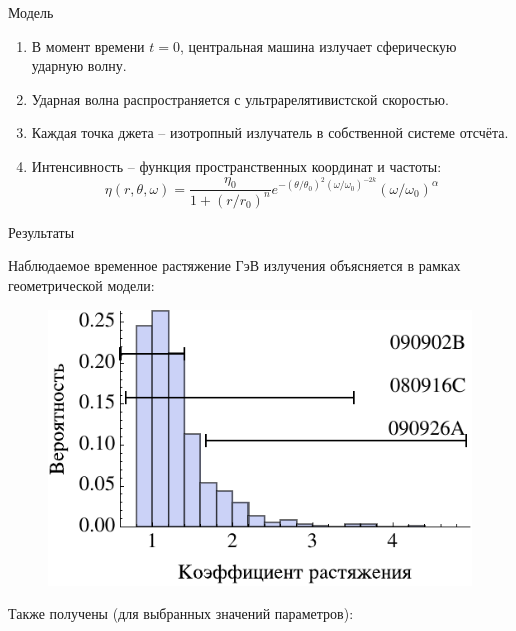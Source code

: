 \documentclass[russian]{beamer}
\begin{document}
\begin{frame}
\begin{columns}[t]
\begin{column}[t]{0.4\linewidth}
\begin{block}{Модель}
					\begin{enumerate}
						\item{В момент времени $t = 0$, центральная машина излучает сферическую ударную волну.}
						\item{Ударная волна распространяется с ультрарелятивистской скоростью.}
						\item{Каждая точка джета -- изотропный излучатель в собственной системе отсчёта.}
						\item{
							Интенсивность -- функция пространственных координат и частоты:
							\begin{equation*}
								\eta\left(r,\theta,\omega\right) = 
								\frac{\eta_0}{1 + \left(r/r_0\right)^n}
								e^{
									-\left(\theta/\theta_0\right)^2
									\left(\omega/\omega_0\right)^{-2k}
								}
								\left(\omega/\omega_0\right)^\alpha
							\end{equation*}
						}
					\end{enumerate}

			   	\end{block}
				
			   	\begin{block}{Результаты}

			   		Наблюдаемое временное растяжение ГэВ излучения объясняется в рамках геометрической модели:

			   		\begin{figure}
			   			\centering
			   			\includegraphics[width=\textwidth]{kappaDistributionHistogram}
			   			\label{fig:kappaDistributionHistogram}
			   		\end{figure}

			   		Также получены (для выбранных значений параметров):


\end{block}
\end{column}
\end{columns}
\end{frame}
\end{document}

